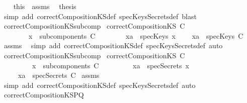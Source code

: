 \begin{isabellebody}
\ \ \isamarkupfalse%
\ this\ \ assms\ \isamarkupfalse%
\ {\isacharquery}thesis\ \isanewline
\ \ \isamarkupfalse%
\ {\isacharparenleft}simp\ add{\isacharcolon}\ correctCompositionKS{\isacharunderscore}def\ specKeysSecrets{\isacharunderscore}def{\isacharcomma}\ blast{\isacharparenright}\isanewline
{}\isamarkupfalse%
%
\endisatagproof
{\isafoldproof}%
%
\isadelimproof
\isanewline
%
\endisadelimproof
\isanewline
{}\isamarkupfalse%
\ correctCompositionKS{\isacharunderscore}subcomp{}{\isacharcolon}\isanewline
{}\ {\isachardoublequoteopen}correctCompositionKS\ C{\isachardoublequoteclose}\isanewline
\ \ \ \ \ \ \ \ {\isachardoublequoteopen}x\ {\isasymin}\ subcomponents\ C{\isachardoublequoteclose}\isanewline
\ \ \ \ \ \ \ \ {\isachardoublequoteopen}xa\ {\isasymin}\ specKeys\ x{\isachardoublequoteclose}\isanewline
{}\ \ \ \ {\isachardoublequoteopen}xa\ {\isasymin}\ specKeys\ C{\isachardoublequoteclose}\isanewline
%
\isadelimproof
%
\endisadelimproof
%
\isatagproof
{}\isamarkupfalse%
\ assms\ \isanewline
{}\isamarkupfalse%
\ {\isacharparenleft}simp\ add{\isacharcolon}\ correctCompositionKS{\isacharunderscore}def\ specKeysSecrets{\isacharunderscore}def{\isacharcomma}\ auto{\isacharparenright}%
\endisatagproof
{\isafoldproof}%
%
\isadelimproof
\isanewline
%
\endisadelimproof
\isanewline
{}\isamarkupfalse%
\ correctCompositionKS{\isacharunderscore}subcomp{}{\isacharcolon}\isanewline
{}\ {\isachardoublequoteopen}correctCompositionKS\ C{\isachardoublequoteclose}\isanewline
\ \ \ \ \ \ \ \ \ {\isachardoublequoteopen}x\ {\isasymin}\ subcomponents\ C{\isachardoublequoteclose}\isanewline
\ \ \ \ \ \ \ \ \ {\isachardoublequoteopen}xa\ {\isasymin}\ specSecrets\ x{\isachardoublequoteclose}\ \isanewline
{}\ \ \ \ \ {\isachardoublequoteopen}xa\ {\isasymin}\ specSecrets\ C{\isachardoublequoteclose}\isanewline
%
\isadelimproof
%
\endisadelimproof
%
\isatagproof
{}\isamarkupfalse%
\ assms\ \isanewline
{}\isamarkupfalse%
\ {\isacharparenleft}simp\ add{\isacharcolon}\ correctCompositionKS{\isacharunderscore}def\ specKeysSecrets{\isacharunderscore}def{\isacharcomma}\ auto{\isacharparenright}%
\endisatagproof
{\isafoldproof}%
%
\isadelimproof
\isanewline
%
\endisadelimproof
\isanewline
{}\isamarkupfalse%
\ correctCompositionKS{\isacharunderscore}PQ{\isacharcolon}\isanewline

\end{isabellebody}
